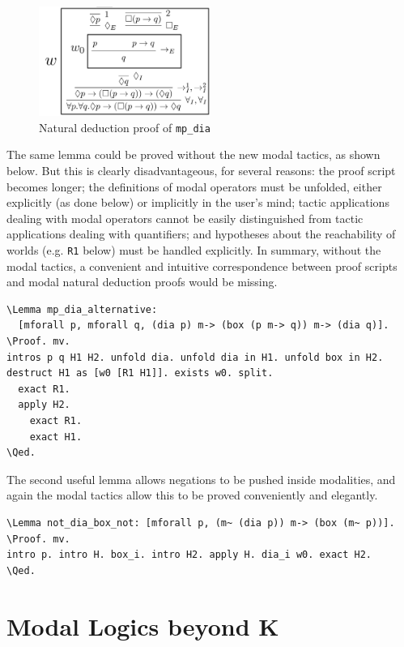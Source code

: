 \documentclass{llncs}
\newcommand{\red}[1]{\textcolor[rgb]{1,0,0}{#1}}
\newcommand{\blue}[1]{\textcolor[rgb]{0,0,1}{#1}}
\newcommand{\Lemma}{\red{Lemma}}
\newcommand{\Proof}{\blue{Proof}}
\newcommand{\Qed}{\blue{Qed}}
\begin{document}
\begin{figure}[H]
\centering
\label{fig:mp_dia}
\includegraphics[width=0.5\textwidth]{ND-(mp_dia).png}
\caption{Natural deduction proof of \texttt{mp\_dia}}
\end{figure}

\noindent
The same lemma could be proved without the new modal tactics, as shown below.
But this is clearly disadvantageous, for several reasons: 
the proof script becomes longer;
the definitions of modal operators must be unfolded, 
either explicitly (as done below) or implicitly in the user's mind; 
tactic applications dealing with modal operators cannot be easily distinguished
from tactic applications dealing with quantifiers; and  
hypotheses about the reachability of worlds (e.g. \texttt{R1} below) 
must be handled explicitly. In summary, without the modal tactics, 
a convenient and intuitive correspondence between proof scripts and 
modal natural deduction proofs would be missing.

\begin{Verbatim}[commandchars=\\\{\},fontsize=\verbsize]
\Lemma mp_dia_alternative: 
  [mforall p, mforall q, (dia p) m-> (box (p m-> q)) m-> (dia q)].
\Proof. mv. 
intros p q H1 H2. unfold dia. unfold dia in H1. unfold box in H2.
destruct H1 as [w0 [R1 H1]]. exists w0. split.
  exact R1.
  apply H2.
    exact R1.
    exact H1.
\Qed.
\end{Verbatim}


\noindent
The second useful lemma allows negations to be pushed inside modalities, 
and again the modal tactics allow this to be proved conveniently and elegantly.

\begin{Verbatim}[commandchars=\\\{\},fontsize=\verbsize]
\Lemma not_dia_box_not: [mforall p, (m~ (dia p)) m-> (box (m~ p))].
\Proof. mv. 
intro p. intro H. box_i. intro H2. apply H. dia_i w0. exact H2. 
\Qed.
\end{Verbatim}


\section{Modal Logics beyond K}
\label{sec:BeyondK}
\end{document}
